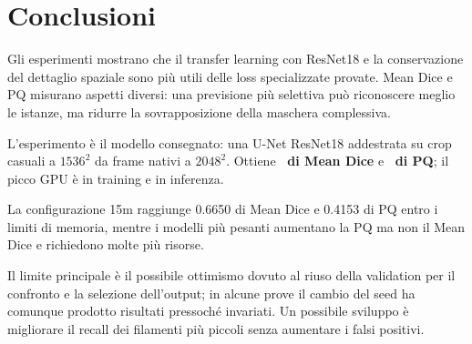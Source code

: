 \section{Conclusioni}
\label{sec:conclusions}

Gli esperimenti mostrano che il transfer learning con ResNet18 e la conservazione del
dettaglio spaziale sono più utili delle loss specializzate provate. Mean Dice e PQ
misurano aspetti diversi: una previsione più selettiva può riconoscere meglio le istanze,
ma ridurre la sovrapposizione della maschera complessiva.

L'esperimento \finalexperiment{} è il modello consegnato: una U-Net ResNet18 addestrata
su crop casuali a $1536^2$ da frame nativi a $2048^2$. Ottiene
\textbf{\finaldice\ di Mean Dice} e \textbf{\finalpq\ di PQ}; il picco GPU è
\finaltrainmemory{} in training e \finaltestmemory{} in inferenza.

La configurazione 15m raggiunge 0.6650 di Mean Dice e 0.4153 di PQ entro i limiti di
memoria, mentre i modelli più pesanti aumentano la PQ ma non il Mean Dice e richiedono
molte più risorse.

Il limite principale è il possibile ottimismo dovuto al riuso della validation per il
confronto e la selezione dell'output; in alcune prove il cambio del seed ha comunque
prodotto risultati pressoché invariati. Un possibile sviluppo è migliorare il recall dei
filamenti più piccoli senza aumentare i falsi positivi.
